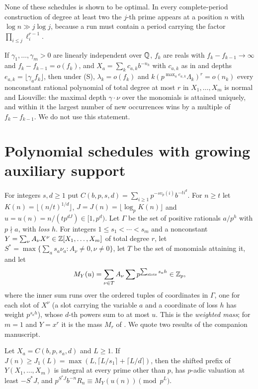 \documentclass[11pt]{article}
\begin{document}
None of these schedules is shown to be optimal. In every complete-period construction of degree at least two the
$j$-th prime appears at a position $n$ with $\log n\gg j\log j$, because a run must contain a period carrying the factor
$\prod_{i\le j}\ell_i^{r-1}$.

\begin{remark}\label{rem:algebras}
If $\gamma_1,\ldots,\gamma_m>0$ are linearly independent over $\mathbb Q$, $f_k$ are reals with $f_k-f_{k-1}\to\infty$ and $f_k-f_{k-1}=o(f_k)$,
and $X_a=\sum_kc_{a,k}b^{-n_k}$ with $c_{a,k}$ as in  and depths $e_{a,k}=\lfloor\gamma_af_k\rfloor$, then under (S),
$\lambda_k=o(f_k)$ and $k(p^{\max_ae_{a,k}}\Lambda_k)^r=o(n_k)$ every nonconstant rational polynomial of total degree at most $r$ in
$X_1,\ldots,X_m$ is normal and Liouville: the maximal depth $\gamma\cdot\nu$ over the monomials is attained uniquely, and within it
the largest number of new occurrences wins by a multiple of $f_k-f_{k-1}$. We do not use this statement.
\end{remark}

\section{Polynomial schedules with growing auxiliary support}\label{sec:hybrid}

For integers $s,d\ge1$ put $C(b,p,s,d)=\sum_{i\ge1}p^{-sv_p(i)}b^{-ti^d}$. For $n\ge t$ let $K(n)=\lfloor(n/t)^{1/d}\rfloor$,
$J=J(n)=\lfloor\log_pK(n)\rfloor$ and $u=u(n)=n/(tp^{dJ})\in[1,p^d)$. Let $\Gamma$ be the set of positive rationals $a/p^h$ with
$p\nmid a$, with \emph{loss} $h$. For integers $1\le s_1<\cdots<s_m$ and a nonconstant $Y=\sum_\nu A_\nu X^\nu\in\mathbb Z[X_1,\ldots,X_m]$
of total degree $r$, let $S^*=\max\{\sum_as_a\nu_a:A_\nu\ne0,\nu\ne0\}$, let $T$ be the set of monomials attaining it, and let
\[
M_Y(u)=\sum_{\nu\in T}A_\nu\sum p^{\sum_{\rm slots}s_{a}h}\in\mathbb Z_p,
\]
where the inner sum runs over the ordered tuples of coordinates in $\Gamma$, one for each slot of $X^\nu$ (a slot carrying
the variable $a$ and a coordinate of loss $h$ has weight $p^{s_ah}$), whose $d$-th powers sum to at most $u$. This is the
\emph{weighted mass}; for $m=1$ and $Y=x^r$ it is the mass $M_r$ of \cite[\S7.5]{PaperVIIv2}. We quote two results of the
companion manuscript.

\begin{theorem}\label{thm:freeze}
Let $X_a=C(b,p,s_a,d)$ and $L\ge1$. If $J(n)\ge J_1(L)=\max(L,\lceil L/s_1\rceil+\lceil L/d\rceil)$, then the shifted prefix of
$Y(X_1,\ldots,X_m)$ is integral at every prime other than $p$, has $p$-adic valuation at least $-S^*J$, and
$p^{S^*J}b^{-n}R_n\equiv M_Y(u(n))\pmod{p^L}$.
\end{theorem}
\end{document}
